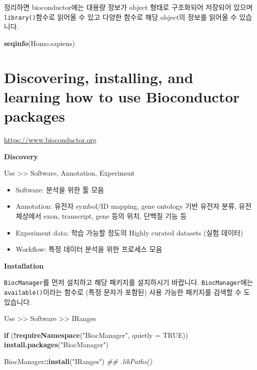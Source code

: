\documentclass[
]{book}
\newenvironment{Shaded}{\begin{snugshade}}{\end{snugshade}}
\newcommand{\CommentTok}[1]{\textcolor[rgb]{0.56,0.35,0.01}{\textit{#1}}}
\newcommand{\ControlFlowTok}[1]{\textcolor[rgb]{0.13,0.29,0.53}{\textbf{#1}}}
\newcommand{\DataTypeTok}[1]{\textcolor[rgb]{0.13,0.29,0.53}{#1}}
\newcommand{\KeywordTok}[1]{\textcolor[rgb]{0.13,0.29,0.53}{\textbf{#1}}}
\newcommand{\NormalTok}[1]{#1}
\newcommand{\OperatorTok}[1]{\textcolor[rgb]{0.81,0.36,0.00}{\textbf{#1}}}
\newcommand{\OtherTok}[1]{\textcolor[rgb]{0.56,0.35,0.01}{#1}}
\newcommand{\StringTok}[1]{\textcolor[rgb]{0.31,0.60,0.02}{#1}}
\providecommand{\tightlist}{%
  \setlength{\itemsep}{0pt}\setlength{\parskip}{0pt}}
\begin{document}
정리하면 bioconductor에는 대용량 정보가 object 형태로 구조화되어 저장되어 있으며 \texttt{library()}함수로 읽어올 수 있고 다양한 함수로 해당 object의 정보를 읽어올 수 있습니다.

\begin{Shaded}
\begin{Highlighting}[]
\KeywordTok{seqinfo}\NormalTok{(Homo.sapiens)}
\end{Highlighting}
\end{Shaded}

\hypertarget{discovering-installing-and-learning-how-to-use-bioconductor-packages}{%
\section{Discovering, installing, and learning how to use Bioconductor packages}\label{discovering-installing-and-learning-how-to-use-bioconductor-packages}}

\url{https://www.bioconductor.org}

\textbf{Discovery}

Use \textgreater\textgreater{} Software, Annotation, Experiment

\begin{itemize}
\tightlist
\item
  Software: 분석을 위한 툴 모음
\item
  Annotation: 유전자 symbol/ID mapping, gene ontology 기반 유전자 분류, 유전체상에서 exon, transcript, gene 등의 위치, 단백질 기능 등
\item
  Experiment data: 학습 가능할 정도의 Highly curated datasets (실험 데이터)
\item
  Workflow: 특정 데이터 분석을 위한 프로세스 모음
\end{itemize}

\textbf{Installation}

\texttt{BiocManager}를 먼저 설치하고 해당 패키지를 설치하시기 바랍니다. \texttt{BiocManager}에는 \texttt{available()}이라는 함수로 (특정 문자가 포함된) 사용 가능한 패키지를 검색할 수 도 있습니다.

Use \textgreater\textgreater{} Software \textgreater\textgreater{} IRanges

\begin{Shaded}
\begin{Highlighting}[]
\ControlFlowTok{if}\NormalTok{ (}\OperatorTok{!}\KeywordTok{requireNamespace}\NormalTok{(}\StringTok{"BiocManager"}\NormalTok{, }\DataTypeTok{quietly =} \OtherTok{TRUE}\NormalTok{))}
    \KeywordTok{install.packages}\NormalTok{(}\StringTok{"BiocManager"}\NormalTok{)}

\NormalTok{BiocManager}\OperatorTok{::}\KeywordTok{install}\NormalTok{(}\StringTok{"IRanges"}\NormalTok{)}
\CommentTok{\#\# .libPaths()}
\end{Highlighting}
\end{Shaded}
\end{document}
